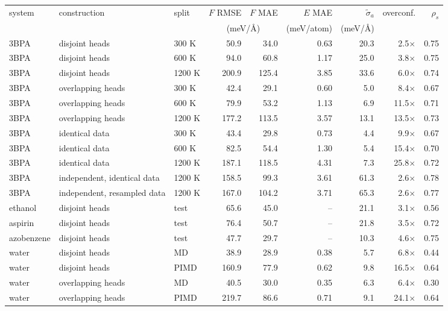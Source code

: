 \begin{tabular}{lllrrrrrr}
\toprule
system & construction & split & $F$ RMSE & $F$ MAE & $E$ MAE & $\tilde\sigma_a$ & overconf. & $\rho_s$ \\
 & & & \multicolumn{2}{c}{(meV/\AA)} & (meV/atom) & (meV/\AA) & & \\
\midrule
3BPA & disjoint heads & 300 K & 50.9 & 34.0 & 0.63 & 20.3 & 2.5$\times$ & 0.75 \\
3BPA & disjoint heads & 600 K & 94.0 & 60.8 & 1.17 & 25.0 & 3.8$\times$ & 0.75 \\
3BPA & disjoint heads & 1200 K & 200.9 & 125.4 & 3.85 & 33.6 & 6.0$\times$ & 0.74 \\
3BPA & overlapping heads & 300 K & 42.4 & 29.1 & 0.60 & 5.0 & 8.4$\times$ & 0.67 \\
3BPA & overlapping heads & 600 K & 79.9 & 53.2 & 1.13 & 6.9 & 11.5$\times$ & 0.71 \\
3BPA & overlapping heads & 1200 K & 177.2 & 113.5 & 3.57 & 13.1 & 13.5$\times$ & 0.73 \\
3BPA & identical data & 300 K & 43.4 & 29.8 & 0.73 & 4.4 & 9.9$\times$ & 0.67 \\
3BPA & identical data & 600 K & 82.5 & 54.4 & 1.30 & 5.4 & 15.4$\times$ & 0.70 \\
3BPA & identical data & 1200 K & 187.1 & 118.5 & 4.31 & 7.3 & 25.8$\times$ & 0.72 \\
3BPA & independent, identical data & 1200 K & 158.5 & 99.3 & 3.61 & 61.3 & 2.6$\times$ & 0.78 \\
3BPA & independent, resampled data & 1200 K & 167.0 & 104.2 & 3.71 & 65.3 & 2.6$\times$ & 0.77 \\
\addlinespace[2pt]
ethanol & disjoint heads & test & 65.6 & 45.0 & -- & 21.1 & 3.1$\times$ & 0.56 \\
\addlinespace[2pt]
aspirin & disjoint heads & test & 76.4 & 50.7 & -- & 21.8 & 3.5$\times$ & 0.72 \\
\addlinespace[2pt]
azobenzene & disjoint heads & test & 47.7 & 29.7 & -- & 10.3 & 4.6$\times$ & 0.75 \\
\addlinespace[2pt]
water & disjoint heads & MD & 38.9 & 28.9 & 0.38 & 5.7 & 6.8$\times$ & 0.44 \\
water & disjoint heads & PIMD & 160.9 & 77.9 & 0.62 & 9.8 & 16.5$\times$ & 0.64 \\
water & overlapping heads & MD & 40.5 & 30.0 & 0.35 & 6.3 & 6.4$\times$ & 0.30 \\
water & overlapping heads & PIMD & 219.7 & 86.6 & 0.71 & 9.1 & 24.1$\times$ & 0.64 \\
\bottomrule
\end{tabular}
